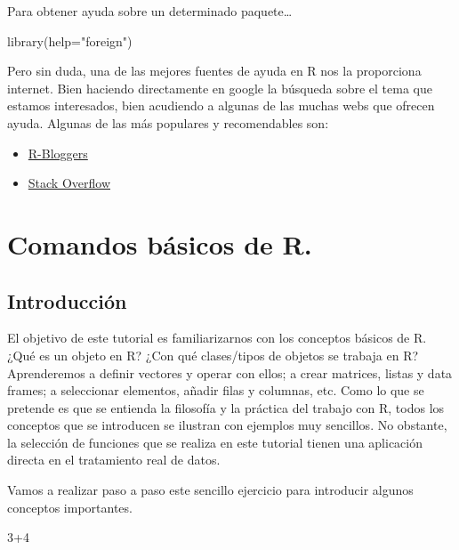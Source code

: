 \documentclass[
]{book}
\newenvironment{Shaded}{\begin{snugshade}}{\end{snugshade}}
\newcommand{\AttributeTok}[1]{\textcolor[rgb]{0.77,0.63,0.00}{#1}}
\newcommand{\DecValTok}[1]{\textcolor[rgb]{0.00,0.00,0.81}{#1}}
\newcommand{\FunctionTok}[1]{\textcolor[rgb]{0.00,0.00,0.00}{#1}}
\newcommand{\NormalTok}[1]{#1}
\newcommand{\SpecialCharTok}[1]{\textcolor[rgb]{0.00,0.00,0.00}{#1}}
\newcommand{\StringTok}[1]{\textcolor[rgb]{0.31,0.60,0.02}{#1}}
\begin{document}
Para obtener ayuda sobre un determinado paquete\ldots{}

\begin{Shaded}
\begin{Highlighting}[]
\FunctionTok{library}\NormalTok{(}\AttributeTok{help=}\StringTok{"foreign"}\NormalTok{)}
\end{Highlighting}
\end{Shaded}

Pero sin duda, una de las mejores fuentes de ayuda en R nos la proporciona internet. Bien haciendo directamente en google la búsqueda sobre el tema que estamos interesados, bien acudiendo a algunas de las muchas webs que ofrecen ayuda. Algunas de las más populares y recomendables son:

\begin{itemize}
\item
  \href{https://www.r-bloggers.com/}{R-Bloggers}
\item
  \href{https://stackoverflow.com/}{Stack Overflow}
\end{itemize}

\hypertarget{comandos-buxe1sicos-de-r.}{%
\chapter{Comandos básicos de R.}\label{comandos-buxe1sicos-de-r.}}

\hypertarget{introducciuxf3n}{%
\section{Introducción}\label{introducciuxf3n}}

El objetivo de este tutorial es familiarizarnos con los conceptos básicos de R. ¿Qué es un objeto en R? ¿Con qué clases/tipos de objetos se trabaja en R?
Aprenderemos a definir vectores y operar con ellos; a crear matrices, listas y data frames; a seleccionar elementos, añadir filas y columnas, etc. Como lo que se pretende es que se entienda la filosofía y la práctica del trabajo con R, todos los conceptos que se introducen se ilustran con ejemplos muy sencillos. No obstante, la selección de funciones que se realiza en este tutorial tienen una aplicación directa en el tratamiento real de datos.

Vamos a realizar paso a paso este sencillo ejercicio para introducir algunos conceptos importantes.

\begin{Shaded}
\begin{Highlighting}[]
\DecValTok{3}\SpecialCharTok{+}\DecValTok{4}
\end{Highlighting}
\end{Shaded}
\end{document}
